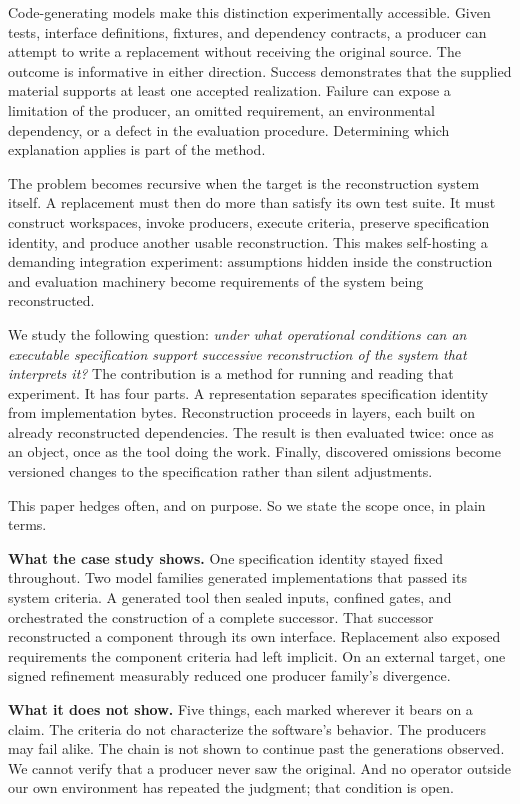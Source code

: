 \documentclass[10pt,twocolumn,letterpaper]{article}
\begin{document}
Code-generating models make this distinction experimentally accessible. Given tests, interface definitions, fixtures, and dependency contracts, a producer can attempt to write a replacement without receiving the original source. The outcome is informative in either direction. Success demonstrates that the supplied material supports at least one accepted realization. Failure can expose a limitation of the producer, an omitted requirement, an environmental dependency, or a defect in the evaluation procedure. Determining which explanation applies is part of the method.

The problem becomes recursive when the target is the reconstruction system itself. A replacement must then do more than satisfy its own test suite. It must construct workspaces, invoke producers, execute criteria, preserve specification identity, and produce another usable reconstruction. This makes self-hosting a demanding integration experiment: assumptions hidden inside the construction and evaluation machinery become requirements of the system being reconstructed.

We study the following question: \emph{under what operational conditions can an executable specification support successive reconstruction of the system that interprets it?} The contribution is a method for running and reading that experiment. It has four parts. A representation separates specification identity from implementation bytes. Reconstruction proceeds in layers, each built on already reconstructed dependencies. The result is then evaluated twice: once as an object, once as the tool doing the work. Finally, discovered omissions become versioned changes to the specification rather than silent adjustments.

This paper hedges often, and on purpose. So we state the scope once, in plain terms.

\vspace{2pt}\noindent\textbf{What the case study shows.} One specification identity stayed fixed throughout. Two model families generated implementations that passed its system criteria. A generated tool then sealed inputs, confined gates, and orchestrated the construction of a complete successor. That successor reconstructed a component through its own interface. Replacement also exposed requirements the component criteria had left implicit. On an external target, one signed refinement measurably reduced one producer family's divergence.

\vspace{2pt}\noindent\textbf{What it does not show.} Five things, each marked wherever it bears on a claim. The criteria do not characterize the software's behavior. The producers may fail alike. The chain is not shown to continue past the generations observed. We cannot verify that a producer never saw the original. And no operator outside our own environment has repeated the judgment; that condition is open.
\end{document}

